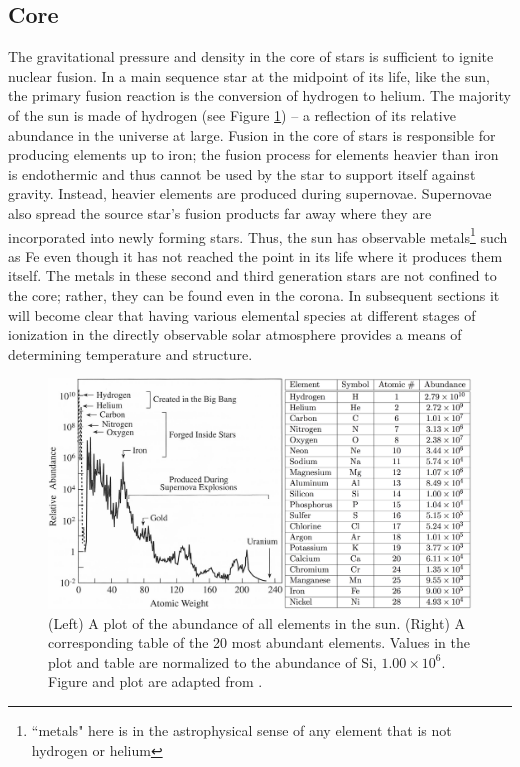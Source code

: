 \subsection{Core}
The gravitational pressure and density in the core of stars is sufficient to ignite nuclear fusion. In a main sequence star at the midpoint of its life, like the sun, the primary fusion reaction is the conversion of hydrogen to helium. The majority of the sun is made of hydrogen (see Figure \ref{fig:sunabundance}) -- a reflection of its relative abundance in the universe at large. Fusion in the core of stars is responsible for producing elements up to iron; the fusion process for elements heavier than iron is endothermic and thus cannot be used by the star to support itself against gravity. Instead, heavier elements are produced during supernovae. Supernovae also spread the source star's fusion products far away where they are incorporated into newly forming stars. Thus, the sun has observable metals\footnote{``metals" here is in the astrophysical sense of any element that is not hydrogen or helium} such as Fe even though it has not reached the point in its life where it produces them itself. The metals in these second and third generation stars are not confined to the core; rather, they can be found even in the corona. In subsequent sections it will become clear that having various elemental species at different stages of ionization in the directly observable solar atmosphere provides a means of determining temperature and structure. 

\begin{figure}[!h]
    \begin{center}
	    \includegraphics[width=\textwidth]{Images/SolarAbundance.png}
    \end{center}
    \caption[Solar Elemental Abundances]{
        (Left) A plot of the abundance of all elements in the sun. (Right) A corresponding table of the 20 most 
        abundant elements. Values in the plot and table are normalized to the abundance of Si, $1.00 \times 10^6$. 
        Figure and plot are adapted from \citet{Lang2001}.       
    }
    \label{fig:sunabundance}
\end{figure}

